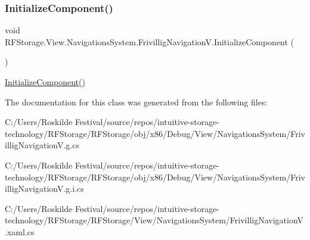 \subsubsection{\texorpdfstring{InitializeComponent()}{InitializeComponent()}}
{\footnotesize\ttfamily void R\+F\+Storage.\+View.\+Navigations\+System.\+Frivillig\+Navigation\+V.\+Initialize\+Component (\begin{DoxyParamCaption}{ }\end{DoxyParamCaption})}



\mbox{\hyperlink{class_r_f_storage_1_1_view_1_1_navigations_system_1_1_frivillig_navigation_v_adc03717682e42aa1db69b9829f8d0927}{Initialize\+Component()}} 



The documentation for this class was generated from the following files\+:\begin{DoxyCompactItemize}
\item 
C\+:/\+Users/\+Roskilde Festival/source/repos/intuitive-\/storage-\/technology/\+R\+F\+Storage/\+R\+F\+Storage/obj/x86/\+Debug/\+View/\+Navigations\+System/Frivillig\+Navigation\+V.\+g.\+cs\item 
C\+:/\+Users/\+Roskilde Festival/source/repos/intuitive-\/storage-\/technology/\+R\+F\+Storage/\+R\+F\+Storage/obj/x86/\+Debug/\+View/\+Navigations\+System/Frivillig\+Navigation\+V.\+g.\+i.\+cs\item 
C\+:/\+Users/\+Roskilde Festival/source/repos/intuitive-\/storage-\/technology/\+R\+F\+Storage/\+R\+F\+Storage/\+View/\+Navigations\+System/Frivillig\+Navigation\+V.\+xaml.\+cs\end{DoxyCompactItemize}
